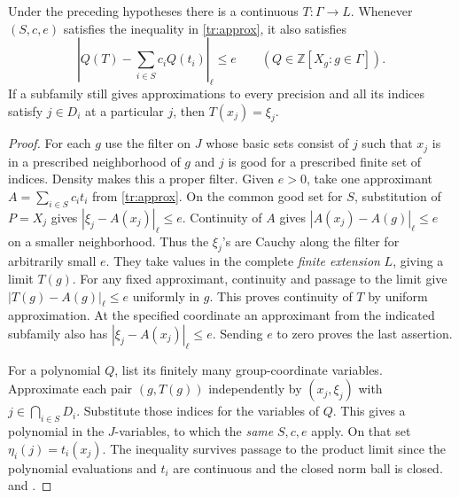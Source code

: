 \begin{proposition}\label{tr:interpolation}
Under the preceding hypotheses there is a continuous \(T:\Gamma\to L\). Whenever \((S,c,e)\) satisfies the inequality in \eqref{tr:approx}, it also satisfies
\[
  \left|Q(T)-\sum_{i\in S}c_iQ(t_i)\right|_\ell\le e
    \qquad(Q\in\mathbb Z[X_g:g\in\Gamma]).
\]
If a subfamily still gives approximations to every precision and all its indices satisfy \(j\in D_i\) at a particular \(j\), then \(T(x_j)=\xi_j\).
\end{proposition}
\begin{proof}
For each \(g\) use the filter on \(J\) whose basic sets consist of \(j\) such that \(x_j\) is in a prescribed neighborhood of \(g\) and \(j\) is good for a prescribed finite set of indices. Density makes this a proper filter. Given \(e>0\), take one approximant \(A=\sum_{i\in S}c_it_i\) from \eqref{tr:approx}. On the common good set for \(S\), substitution of \(P=X_j\) gives \(|\xi_j-A(x_j)|_\ell\le e\). Continuity of \(A\) gives \(|A(x_j)-A(g)|_\ell\le e\) on a smaller neighborhood. Thus the \(\xi_j\)'s are Cauchy along the filter for arbitrarily small \(e\). They take values in the complete \emph{finite extension} \(L\), giving a limit \(T(g)\). For any fixed approximant, continuity and passage to the limit give \(|T(g)-A(g)|_\ell\le e\) uniformly in \(g\). This proves continuity of \(T\) by uniform approximation. At the specified coordinate an approximant from the indicated subfamily also has \(|\xi_j-A(x_j)|_\ell\le e\). Sending \(e\) to zero proves the last assertion.

For a polynomial \(Q\), list its finitely many group-coordinate variables. Approximate each pair \((g,T(g))\) independently by \((x_j,\xi_j)\) with \(j\in\bigcap_{i\in S}D_i\). Substitute those indices for the variables of \(Q\). This gives a polynomial in the \(J\)-variables, to which the \emph{same} \(S,c,e\) apply. On that set \(\eta_i(j)=t_i(x_j)\). The inequality survives passage to the product limit since the polynomial evaluations and \(t_i\) are continuous and the closed norm ball is closed.  and .
\end{proof}

